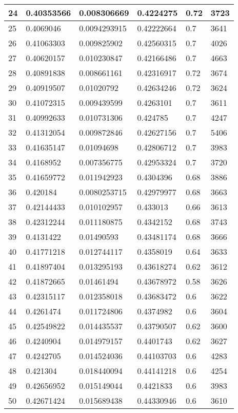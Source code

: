 \begin{longtable}{|l|l|l|l|l|l|}
24 & 0.40353566 & 0.008306669 & 0.4224275 & 0.72 & 3723 \\ \hline 
25 & 0.4069046 & 0.0094293915 & 0.42222664 & 0.7 & 3641 \\ \hline 
26 & 0.41063303 & 0.009825902 & 0.42560315 & 0.7 & 4026 \\ \hline 
27 & 0.40620157 & 0.010230847 & 0.42166486 & 0.7 & 4663 \\ \hline 
28 & 0.40891838 & 0.008661161 & 0.42316917 & 0.72 & 3674 \\ \hline 
29 & 0.40919507 & 0.01020792 & 0.42634246 & 0.72 & 3624 \\ \hline 
30 & 0.41072315 & 0.009439599 & 0.4263101 & 0.7 & 3611 \\ \hline 
31 & 0.40992633 & 0.010731306 & 0.424785 & 0.7 & 4247 \\ \hline 
32 & 0.41312054 & 0.009872846 & 0.42627156 & 0.7 & 5406 \\ \hline 
33 & 0.41635147 & 0.01094698 & 0.42806712 & 0.7 & 3983 \\ \hline 
34 & 0.4168952 & 0.007356775 & 0.42953324 & 0.7 & 3720 \\ \hline 
35 & 0.41659772 & 0.011942923 & 0.4304396 & 0.68 & 3886 \\ \hline 
36 & 0.420184 & 0.0080253715 & 0.42979977 & 0.68 & 3663 \\ \hline 
37 & 0.42144433 & 0.010102957 & 0.433013 & 0.66 & 3613 \\ \hline 
38 & 0.42312244 & 0.011180875 & 0.4342152 & 0.68 & 3743 \\ \hline 
39 & 0.4131422 & 0.01490593 & 0.43481174 & 0.68 & 3666 \\ \hline 
40 & 0.41771218 & 0.012744117 & 0.4358019 & 0.64 & 3633 \\ \hline 
41 & 0.41897404 & 0.013295193 & 0.43618274 & 0.62 & 3612 \\ \hline 
42 & 0.41872665 & 0.01461494 & 0.43678972 & 0.58 & 3626 \\ \hline 
43 & 0.42315117 & 0.012358018 & 0.43683472 & 0.6 & 3622 \\ \hline 
44 & 0.4261474 & 0.011724806 & 0.4374982 & 0.6 & 3604 \\ \hline 
45 & 0.42549822 & 0.014435537 & 0.43790507 & 0.62 & 3600 \\ \hline 
46 & 0.4240904 & 0.014979157 & 0.4401743 & 0.62 & 3627 \\ \hline 
47 & 0.4242705 & 0.014524036 & 0.44103703 & 0.6 & 4283 \\ \hline 
48 & 0.421304 & 0.018440094 & 0.44141218 & 0.6 & 4254 \\ \hline 
49 & 0.42656952 & 0.015149044 & 0.4421833 & 0.6 & 3983 \\ \hline 
50 & 0.42671424 & 0.015689438 & 0.44330946 & 0.6 & 3610 \\ \hline 
\end{longtable}